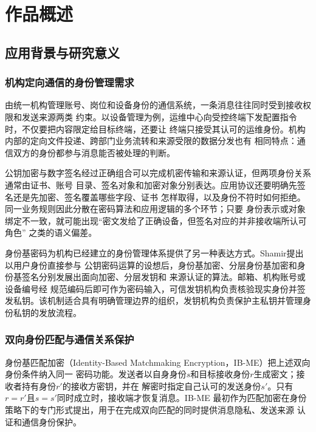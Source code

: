 \chapter{作品概述}

\section{应用背景与研究意义}

\subsection{机构定向通信的身份管理需求}

由统一机构管理账号、岗位和设备身份的通信系统，一条消息往往同时受到接收权限和发送来源两类
约束。以设备管理为例，运维中心向受控终端下发配置指令时，不仅要把内容限定给目标终端，还要让
终端只接受其认可的运维身份。机构内部的定向文件投递、跨部门业务流转和来源受限的数据分发也有
相同特点：通信双方的身份都参与消息能否被处理的判断。

公钥加密与数字签名经过正确组合可以完成机密传输和来源认证，但两项身份关系通常由证书、账号
目录、签名对象和加密对象分别表达。应用协议还要明确先签名还是先加密、签名覆盖哪些字段、证书
怎样取得，以及身份不符时如何拒绝。同一业务规则因此分散在密码算法和应用逻辑的多个环节；只要
身份表示或对象绑定不一致，就可能出现“密文发给了正确设备，但签名对应的并非接收端所认可角色”
之类的语义偏差。

身份基密码为机构已经建立的身份管理体系提供了另一种表达方式。Shamir提出以用户身份直接参与
公钥密码运算的设想后，身份基加密、分层身份基加密和身份基签名分别发展出面向加密、分层发钥和
来源认证的算法\cite{shamir1984,gentrysilverberg2002,hess2003ibs}。邮箱、机构账号或设备编号经
规范编码后即可作为密码输入，可信发钥机构负责核验现实身份并签发私钥。该机制适合具有明确管理边界的组织，发钥机构负责保护主私钥并管理身份私钥的发放流程。

\subsection{双向身份匹配与通信关系保护}

身份基匹配加密（Identity-Based Matchmaking Encryption，IB-ME）把上述双向身份条件纳入同一
密码功能。发送者以自身身份$s$和目标接收身份$r$生成密文；接收者持有身份$r'$的接收方密钥，并在
解密时指定自己认可的发送身份$s'$。只有$r=r'$且$s=s'$同时成立时，接收端才恢复消息。IB-ME
最初作为匹配加密在身份策略下的专门形式提出，用于在完成双向匹配的同时提供消息隐私、发送来源
认证和通信身份保护\cite{ateniese2019me}。

